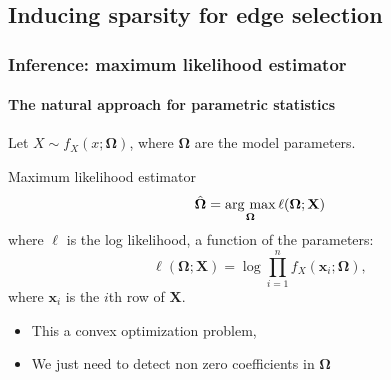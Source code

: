 \subsection{Inducing sparsity for edge selection}

\begin{frame}
  \frametitle{Inference: maximum likelihood estimator}
  \framesubtitle{The natural approach for parametric statistics}

  Let   $X\sim f_{X}(x;\boldsymbol\Omega)$,  where   $\boldsymbol\Omega$  are  the
  model parameters.

  \vfill

  \begin{block}{Maximum likelihood estimator}
    \begin{equation*}
      \hat{\boldsymbol\Omega}      =      \mathop{\mathrm{arg\ max}}_{\boldsymbol\Omega}
      \ell(\boldsymbol\Omega; \mathbf{X})
    \end{equation*}
    where  $\ell$ is  the log  likelihood, a  function  of the
    parameters:
    \begin{equation*}
      \ell(\boldsymbol\Omega;      \mathbf{X})      =     \log
      \prod_{i=1}^n f_{X}(\mathbf{x}_i;\boldsymbol\Omega),
    \end{equation*}
    where $\mathbf{x}_i$ is the $i$th row of $\mathbf{X}$.
  \end{block}

  \vfill
  
  \begin{itemize}
    \item This a convex optimization problem,
    \item We just need to detect non zero coefficients in $\boldsymbol\Omega$
  \end{itemize}

\end{frame}

